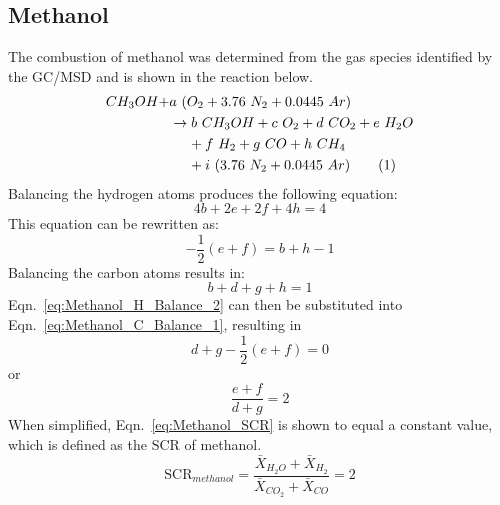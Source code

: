 \documentclass[12pt]{article}
\newcommand\numberthis{\addtocounter{equation}{1}\tag{\theequation}}
\begin{document}
\subsection{Methanol}
\label{ssec:Methanol_SCR}
The combustion of methanol was determined from the gas species identified by the GC/MSD and is shown in the reaction below.
\begin{align*}
CH_{3}OH+&a~(O_{2}+3.76~N_{2}+0.0445~Ar)\\
&\rightarrow b~CH_{3}OH+c~O_{2}+ d~CO_{2}+e~H_{2}O\\
&~~~~+f~H_{2}+ g~CO+h~CH_{4}\\
&~~~~+i~(3.76~N_{2}+0.0445~Ar) \numberthis \label{eq:Methanol_rxn}
\end{align*}
Balancing the hydrogen atoms produces the following equation:
\begin{equation}
\label{eq:Methanol_H_Balance_1}
4b+2e+2f+4h=4
\end{equation}
This equation can be rewritten as:
\begin{equation}
\label{eq:Methanol_H_Balance_2}
-\frac{1}{2}\left(e+f\right)=b+h-1
\end{equation}
Balancing the carbon atoms results in:
\begin{equation}
\label{eq:Methanol_C_Balance_1}
b+d+g+h=1
\end{equation}
Eqn.~\ref{eq:Methanol_H_Balance_2} can then be substituted into Eqn.~\ref{eq:Methanol_C_Balance_1}, resulting in
\begin{equation}
\label{eq:Methanol_C_Balance_2}
d+g-\frac{1}{2}\left(e+f\right)=0
\end{equation}
or 
\begin{equation}
\label{eq:Methanol_SCR}
\frac{e+f}{d+g}=2
\end{equation}
When simplified, Eqn.~\ref{eq:Methanol_SCR} is shown to equal a constant value, which is defined as the $\text{SCR}$ of methanol.
\begin{equation}\label{eq:prod_ratio_methanol}
 \text{SCR}_{methanol}=\frac{\bar{X}_{H_2O}+\bar{X}_{H_2}}{\bar{X}_{CO_2}+\bar{X}_{CO}}=2
\end{equation}

\pagebreak
\end{document}
